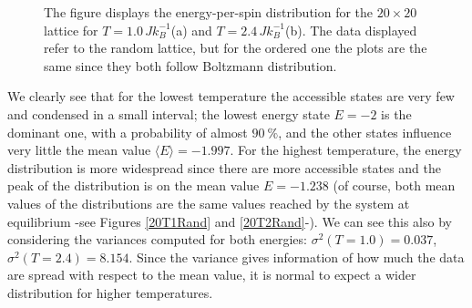 \documentclass[%
 reprint,
 amsmath,amssymb,
 aps,
]{revtex4-1}
\theoremstyle{plain}
\theoremstyle{definition}
\theoremstyle{plain}
\newcommand{\mean}[1]{\langle #1\rangle}
\begin{document}
\begin{figure}[h!]
	\label{probabilities}
	\centering
	\qquad
	\caption{The figure displays the energy-per-spin distribution for the $20\times20$ lattice for $T=1.0\,Jk_B^{-1}$(a) and $T=2.4\,Jk_B^{-1}$(b). The data displayed refer to the random lattice, but for the ordered one the plots are the same since they both follow Boltzmann distribution.}
\end{figure}

We clearly see that for the lowest temperature the accessible states are very few and condensed in a small interval; the lowest energy state $E=-2$ is the dominant one, with a probability of almost $\SI{90}{\percent}$, and the other states influence very little the mean value $\mean{E}=-1.997$. For the highest temperature, the energy distribution is more widespread since there are more accessible states and the peak of the distribution is on the mean value $E = -1.238$ (of course, both mean values of the distributions are the same values reached by the system at equilibrium -see Figures \ref{20T1Rand} and \ref{20T2Rand}-). We can see this also by considering the variances computed for both energies: $\sigma^2(T=1.0)=0.037$, $\sigma^2(T=2.4)=8.154$. Since the variance gives information of how much the data are spread with respect to the mean value, it is normal to expect a wider distribution for higher temperatures.
\end{document}
